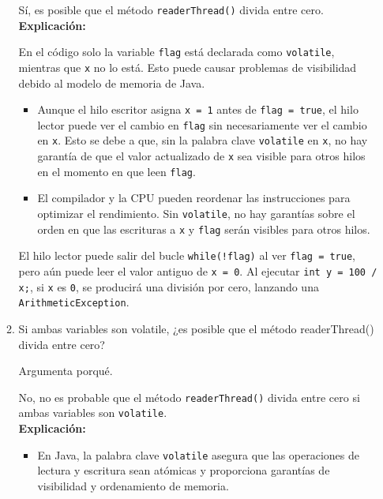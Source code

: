 \begin{enumerate}
\begin{enumerate}
        Sí, es posible que el método \texttt{readerThread()} divida entre cero.\\

        \textbf{Explicación:}

        En el código solo la variable \texttt{flag} está declarada como \texttt{volatile}, mientras que \texttt{x} no lo está. Esto puede causar problemas de visibilidad debido al modelo de memoria de Java.
        
        \begin{itemize}
            \item Aunque el hilo escritor asigna \texttt{x = 1} antes de \texttt{flag = true}, el hilo lector puede ver el cambio en \texttt{flag} sin necesariamente ver el cambio en \texttt{x}. Esto se debe a que, sin la palabra clave \texttt{volatile} en \texttt{x}, no hay garantía de que el valor actualizado de \texttt{x} sea visible para otros hilos en el momento en que leen \texttt{flag}.
        
            \item El compilador y la CPU pueden reordenar las instrucciones para optimizar el rendimiento. Sin \texttt{volatile}, no hay garantías sobre el orden en que las escrituras a \texttt{x} y \texttt{flag} serán visibles para otros hilos.
        \end{itemize}
        
        El hilo lector puede salir del bucle \texttt{while(!flag){}} al ver \texttt{flag = true}, pero aún puede leer el valor antiguo de \texttt{x = 0}. Al ejecutar \texttt{int y = 100 / x;}, si \texttt{x} es \texttt{0}, se producirá una división por cero, lanzando una \texttt{ArithmeticException}.\\

        \item Si ambas variables son volatile, ¿es posible que el método readerThread() divida entre cero?
        
        Argumenta porqué.

        No, no es probable que el método \texttt{readerThread()} divida entre cero si ambas variables son \texttt{volatile}.\\

        \textbf{Explicación:}
        \begin{itemize}
            \item En Java, la palabra clave \texttt{volatile} asegura que las operaciones de lectura y escritura sean atómicas y proporciona garantías de visibilidad y ordenamiento de memoria.
        

\end{itemize}
\end{enumerate}
\end{enumerate}
